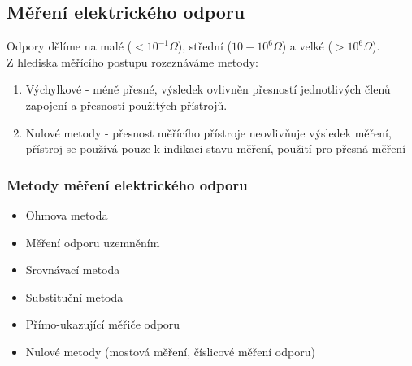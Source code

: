 \subsection{Měření elektrického odporu}
Odpory dělíme na malé (\(<10^{-1}\Omega \)), střední (\(10-10^6\Omega \)) a velké (\(>10^6\Omega \)).\\
Z hlediska měřícího postupu rozeznáváme metody:
\begin{enumerate}
    \item Výchylkové - méně přesné, výsledek ovlivněn přesností jednotlivých členů zapojení a přesností použitých přístrojů.
    \item Nulové metody - přesnost měřícího přístroje neovlivňuje výsledek měření, přístroj se používá pouze k indikaci stavu měření, použití pro přesná měření
\end{enumerate}
\subsubsection{Metody měření elektrického odporu}
\begin{itemize}
    \item Ohmova metoda
    \item Měření odporu uzemněním
    \item Srovnávací metoda
    \item Substituční metoda
    \item Přímo-ukazující měřiče odporu
    \item Nulové metody (mostová měření, číslicové měření odporu)
\end{itemize}

